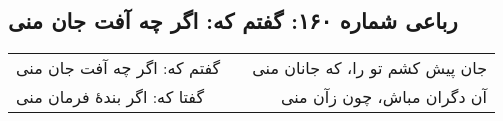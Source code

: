 \begin{center}
\section*{رباعی شماره ۱۶۰: گفتم که: اگر چه آفت جان منی}
\label{sec:160}
\begin{longtable}{l p{0.5cm} r}
گفتم که: اگر چه آفت جان منی
&&
جان پیش کشم تو را، که جانان منی
\\
گفتا که: اگر بندهٔ فرمان منی
&&
آن دگران مباش، چون زآن منی
\\
\end{longtable}
\end{center}
